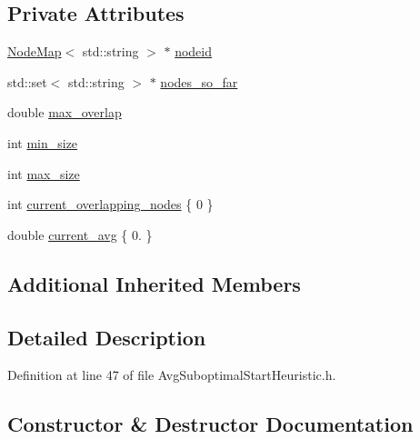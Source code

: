 \subsection*{Private Attributes}
\begin{DoxyCompactItemize}
\item 
\hyperlink{namespacederegnet_ae102b707ae1d6f83c639ece5e0dd5658}{Node\+Map}$<$ std\+::string $>$ $\ast$ \hyperlink{classderegnet_1_1AvgSuboptimalStartHeuristic_af59e6b6ba10fd5d2c210a0947cf37e66}{nodeid}
\item 
std\+::set$<$ std\+::string $>$ $\ast$ \hyperlink{classderegnet_1_1AvgSuboptimalStartHeuristic_ac07c2b61bf03b25e1bd87cb353bd4597}{nodes\+\_\+so\+\_\+far}
\item 
double \hyperlink{classderegnet_1_1AvgSuboptimalStartHeuristic_a6e019ada1557663d456e7f81757d14ab}{max\+\_\+overlap}
\item 
int \hyperlink{classderegnet_1_1AvgSuboptimalStartHeuristic_a71b5a73f79c4c161e9df9085ece2c270}{min\+\_\+size}
\item 
int \hyperlink{classderegnet_1_1AvgSuboptimalStartHeuristic_aafc01553c8d2a9a877f23c6bdee305aa}{max\+\_\+size}
\item 
int \hyperlink{classderegnet_1_1AvgSuboptimalStartHeuristic_ad541b941d327ba928a7951e43ad1fea4}{current\+\_\+overlapping\+\_\+nodes} \{ 0 \}
\item 
double \hyperlink{classderegnet_1_1AvgSuboptimalStartHeuristic_a5c07fde8d2f92daeb4cc33f85e8bf1e2}{current\+\_\+avg} \{ 0. \}
\end{DoxyCompactItemize}
\subsection*{Additional Inherited Members}


\subsection{Detailed Description}


Definition at line 47 of file Avg\+Suboptimal\+Start\+Heuristic.\+h.



\subsection{Constructor \& Destructor Documentation}
